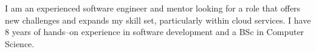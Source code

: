 \documentclass[8pt]{developercv} %
\begin{document}

\begin{minipage}[t]{0.4\textwidth} %
	\vspace{-\baselineskip} %
	\raggedright
	I am an experienced software engineer and mentor looking for a role that offers new challenges and expands my skill set, particularly within cloud services. I have 8 years of hands--on experience in software development and a BSc in Computer Science.
\end{minipage}
\hfill %
\begin{minipage}[t]{0.25\textwidth} %
	\vspace{-\baselineskip} %
	\begin{barchart}{0}
	\end{barchart}
\end{minipage}
\hfill %
\begin{minipage}[t]{0.3\textwidth} %
	\vspace{-\baselineskip} %
	\begin{barchart}{5}
		
	\end{barchart}
\end{minipage}



\end{document}
